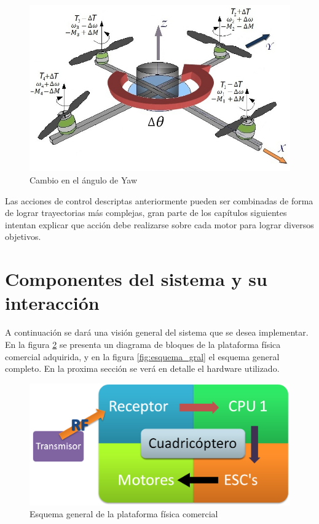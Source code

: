 \documentclass[main]{subfiles}
\begin{document}
\begin{figure}[!h]
\centering
\includegraphics[scale=0.4]{./pics_general/quad_theta.jpg}
\caption{Cambio en el \'angulo de Yaw}
\label{fig:quad_theta}
\end{figure}
Las acciones de control descriptas anteriormente pueden ser combinadas de forma de lograr trayectorias m\'as complejas, gran parte de los cap\'itulos siguientes intentan explicar que acci\'on debe realizarse sobre cada motor para lograr diversos objetivos.

\section{Componentes del sistema y su interacci\'on}

A continuaci\'on se dar\'a una visi\'on general del sistema que se desea implementar. En la figura \ref{fig:esquema_gral_recortado} se presenta un diagrama de bloques de la plataforma física comercial adquirida, y en la figura \ref{fig:esquema_gral} el esquema general completo. En la proxima secci\'on se ver\'a en detalle el hardware utilizado.\\

\begin{figure}[h!]
  \centering
  \includegraphics[width=.6\textwidth]{./pics_general/diagrama_gral_recortado_2.png}
  \caption{Esquema general de la plataforma física comercial}
  \label{fig:esquema_gral_recortado}
\end{figure}
\end{document}
